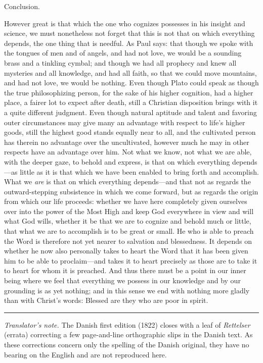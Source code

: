\documentclass[12pt,a4paper]{book}
\begin{document}
\begin{center}\large Conclusion.\end{center}
However great is that which the one who cognizes possesses in his insight and science, we
must nonetheless not forget that this is not that on which everything depends, the one
thing that is needful. As Paul says: that though we spoke with the tongues of men and of
angels, and had not love, we would be a sounding brass and a tinkling cymbal; and though
we had all prophecy and knew all mysteries and all knowledge, and had all faith, so that
we could move mountains, and had not love, we would be nothing. Even though Plato could
speak as though the true philosophizing person, for the sake of his higher cognition, had
a higher place, a fairer lot to expect after death, still a Christian disposition brings
with it a quite different judgment. Even though natural aptitude and talent and favoring
outer circumstances may give many an advantage with respect to life's higher goods, still
the highest good stands equally near to all, and the cultivated person has therein no
advantage over the uncultivated, however much he may in other respects have an advantage
over him. Not what we know, not what we are able, with the deeper gaze, to behold and
express, is that on which everything depends---as little as it is that which we have been
enabled to bring forth and accomplish. What we \emph{are} is that on which everything
depends---and that not as regards the outward-stepping subsistence in which we come
forward, but as regards the origin from which our life proceeds: whether we have here
completely given ourselves over into the power of the Most High and keep God everywhere
in view and will what God wills, whether it be that we are to cognize and behold much or
little, that what we are to accomplish is to be great or small. He who is able to preach
the Word is therefore not yet nearer to salvation and blessedness. It depends on whether
he now also personally takes to heart the Word that it has been given him to be able to
proclaim---and takes it to heart precisely as those are to take it to heart for whom it
is preached. And thus there must be a point in our inner being where we feel that
everything we possess in our knowledge and by our grounding is as yet nothing; and in
this sense we end with nothing more gladly than with Christ's words: Blessed are they who
are poor in spirit.

\bigskip
\begin{center}\rule{0.28\linewidth}{0.4pt}\end{center}

{\footnotesize\noindent\emph{Translator's note.} The Danish first edition (1822)
closes with a leaf of \emph{Rettelser} (errata) correcting a few page-and-line
orthographic slips in the Danish text. As these corrections concern only the
spelling of the Danish original, they have no bearing on the English and are not
reproduced here.\par}
\end{document}
